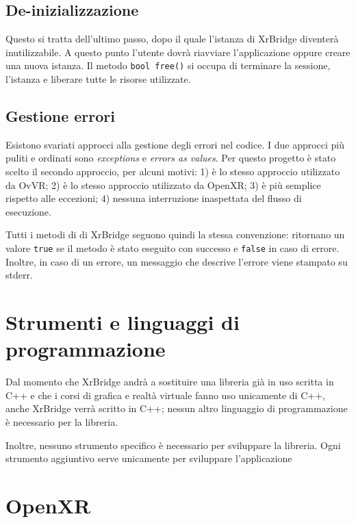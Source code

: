\documentclass[twoside]{supsistudent}
\begin{document}
\subsection{De-inizializzazione}

Questo si tratta dell'ultimo passo, dopo il quale l'istanza di XrBridge diventerà inutilizzabile. A questo punto l'utente dovrà riavviare l'applicazione oppure creare una nuova istanza. Il metodo \texttt{bool free()} si occupa di terminare la sessione, l'istanza e liberare tutte le risorse utilizzate.

\subsection{Gestione errori}

Esistono svariati approcci alla gestione degli errori nel codice. I due approcci più puliti e ordinati sono \textit{exceptions} e \textit{errors as values}. Per questo progetto è stato scelto il secondo approccio, per alcuni motivi: 1) è lo stesso approccio utilizzato da OvVR; 2) è lo stesso approccio utilizzato da OpenXR; 3) è più semplice rispetto alle eccezioni; 4) nessuna interruzione inaspettata del flusso di esecuzione.

Tutti i metodi di di XrBridge seguono quindi la stessa convenzione: ritornano un valore \texttt{true} se il metodo è stato eseguito con successo e \texttt{false} in caso di errore. Inoltre, in caso di un errore, un messaggio che descrive l'errore viene stampato su stderr.

\section{Strumenti e linguaggi di programmazione}

Dal momento che XrBridge andrà a sostituire una libreria già in uso scritta in C++ e che i corsi di grafica e realtà virtuale fanno uso unicamente di C++, anche XrBridge verrà scritto in C++; nessun altro linguaggio di programmazione è necessario per la libreria.

Inoltre, nessuno strumento specifico è necessario per sviluppare la libreria. Ogni strumento aggiuntivo serve unicamente per sviluppare l'applicazione


\section{OpenXR}
\end{document}
